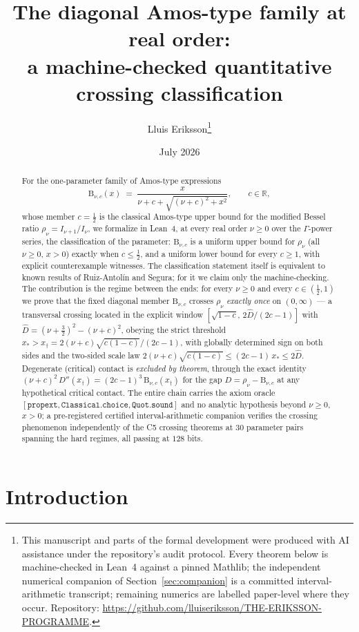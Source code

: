 \documentclass[11pt]{article}
\title{The diagonal Amos-type family at real order:\\
a machine-checked quantitative crossing classification}
\author{Lluis Eriksson\thanks{This manuscript and parts of the formal
development were produced with AI assistance under the repository's
audit protocol.  Every theorem below is machine-checked in Lean~4
against a pinned Mathlib; the independent numerical companion of
Section~\ref{sec:companion} is a committed interval-arithmetic
transcript; remaining numerics are labelled paper-level where they
occur.  Repository:
\url{https://github.com/lluiseriksson/THE-ERIKSSON-PROGRAMME}.}}
\date{July 2026}
\newcommand{\lean}[1]{\texttt{#1}}
\newcommand{\Bfam}{\mathrm{B}}
\begin{document}
\maketitle

\begin{abstract}
For the one-parameter family of Amos-type expressions
\[
\Bfam_{\nu,c}(x) \;=\; \frac{x}{\nu+c+\sqrt{(\nu+c)^2+x^2}},
\qquad c \in \mathbb{R},
\]
whose member $c = \tfrac12$ is the classical Amos-type upper bound
for the modified Bessel ratio $\rho_\nu = I_{\nu+1}/I_\nu$, we
formalize in Lean~4, at every real order $\nu \ge 0$ over the
$\Gamma$-power series, the classification of the parameter:
$\Bfam_{\nu,c}$ is a uniform upper bound for $\rho_\nu$ (all
$\nu \ge 0$, $x > 0$) exactly when $c \le \tfrac12$, and a uniform
lower bound for every $c \ge 1$, with explicit counterexample
witnesses.  The classification statement itself is
equivalent to known results of Ruiz-Antol\'in and Segura; for it we
claim only the machine-checking.  The contribution is the regime
between the ends: for every $\nu \ge 0$ and every
$c \in (\tfrac12, 1)$ we prove that the fixed diagonal member
$\Bfam_{\nu,c}$ crosses $\rho_\nu$ \emph{exactly once} on
$(0,\infty)$ --- a transversal crossing located in the explicit
window $[\sqrt{1-c},\, 2\hat{D}/(2c-1)]$ with
$\hat{D} = (\nu+\tfrac32)^2 - (\nu+c)^2$, obeying the strict
threshold $x_* > x_\dagger = 2(\nu+c)\sqrt{c(1-c)}/(2c-1)$, with
globally determined sign on both sides and the two-sided scale law
$2(\nu+c)\sqrt{c(1-c)} \le (2c-1)\,x_* \le 2\hat{D}$.  Degenerate
(critical) contact is \emph{excluded by theorem}, through the exact
identity $(\nu+c)^2\,D''(x_\dagger) = (2c-1)^3\,\Bfam_{\nu,c}(x_\dagger)$
for the gap $D = \rho_\nu - \Bfam_{\nu,c}$ at any hypothetical
critical contact.  The entire chain carries the
axiom oracle
$[\lean{propext}, \lean{Classical.choice}, \lean{Quot.sound}]$ and
no analytic hypothesis beyond $\nu \ge 0$, $x > 0$; a pre-registered
certified interval-arithmetic companion verifies the crossing
phenomenon independently of the C5 crossing theorems at $30$ parameter
pairs spanning the hard regimes, all passing at $128$ bits.
\end{abstract}

\section{Introduction}
\end{document}
